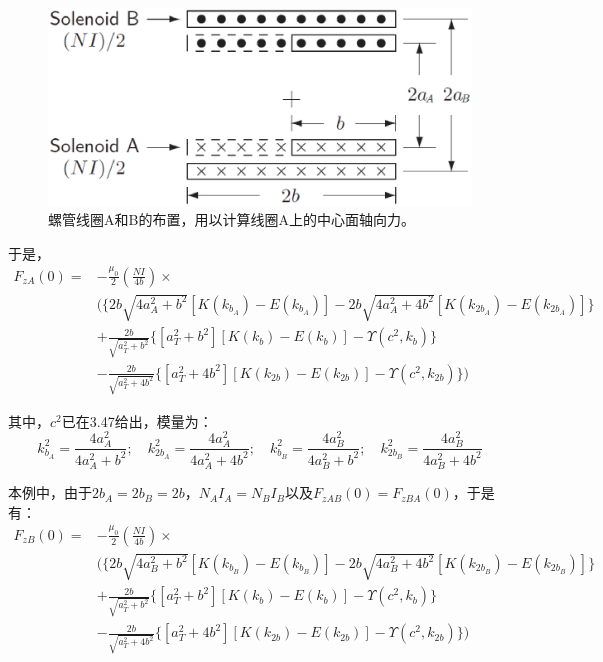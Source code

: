\begin{figure}[htbp]
  \centering
 \includegraphics[scale=0.4]{chpt3/figs/fig3.8.eps}
  \caption{螺管线圈A和B的布置，用以计算线圈A上的中心面轴向力。}
\end{figure}

于是，
\begin{equation}
\begin{split}
F_{zA}(0)=&-\frac{\mu_0}{2}(\frac{N I}{4b})\times \\
&( \{2b\sqrt{4a_A^2+b^2}[K(k_{b_A})-E(k_{b_A})]-2b\sqrt{4a_A^2+4b^2}[K(k_{2b_A})-E(k_{2b_A})]\}\\
&+\frac{2b}{\sqrt{a_T^2+b^2}} \{[a_T^2+b^2][K(k_{b})-E(k_{b})]-\Upsilon(c^2,k_b)\}\\
&-\frac{2b}{\sqrt{a_T^2+4b^2}} \{[a_T^2+4b^2][K(k_{2b})-E(k_{2b})]-\Upsilon(c^2,k_{2b}) \})
\end{split}
\end{equation}

其中，$c^2$已在3.47给出，模量为：
$$k_{b_A}^2=\frac{4a_A^2}{4a_A^2+b^2} ;\quad k_{2b_A}^2=\frac{4a^2_A}{4a_A^2+4b^2};\quad
k_{b_B}^2=\frac{4a_B^2}{4a_B^2+b^2} ;\quad k_{2b_B}^2=\frac{4a^2_B}{4a_B^2+4b^2} $$

本例中，由于$2b_A=2b_B=2b$，$N_A I_A=N_B I_B$以及$F_{zAB}(0)=F_{zBA}(0)$，于是有：
\begin{equation*}
\begin{split}
F_{zB}(0)=&-\frac{\mu_0}{2}(\frac{N I}{4b})\times \\
&\bigg( \{2b\sqrt{4a_B^2+b^2}[K(k_{b_B})-E(k_{b_B})]-2b\sqrt{4a_B^2+4b^2}[K(k_{2b_B})-E(k_{2b_B})]\}\\
&+\frac{2b}{\sqrt{a_T^2+b^2}} \{[a_T^2+b^2][K(k_{b})-E(k_{b})]-\Upsilon(c^2,k_b)\}\\
&-\frac{2b}{\sqrt{a_T^2+4b^2}} \{[a_T^2+4b^2][K(k_{2b})-E(k_{2b})]-\Upsilon(c^2,k_{2b}) \}\bigg)
\end{split}\tag{3.53'}
\end{equation*}

